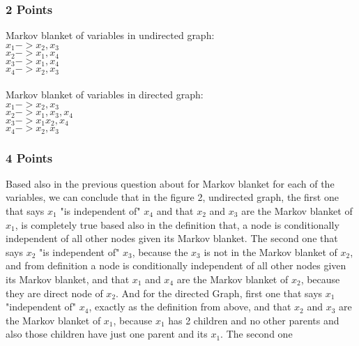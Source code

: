 \subsubsection{2 Points}
Markov blanket of variables in undirected graph:\\ 
$x_1->x_2,x_3$\\
$x_2->x_1,x_4$\\
$x_3->x_1,x_4$\\
$x_4->x_2,x_3$\\ \\
Markov blanket of variables in directed graph:\\
$x_1->x_2,x_3$\\
$x_2->x_1,x_3,x_4$\\
$x_3->x_1x_2,x_4$\\
$x_4->x_2,x_3$


\subsubsection{4 Points}
Based also in the previous question about for Markov blanket for each of the variables, we can conclude that in the figure 2, undirected graph, the first one that says $x_1$ "is independent of" $x_4$ and that $x_2$ and $x_3$ are the Markov blanket of $x_1$, is completely true based also in the definition that, a node is conditionally independent of all other nodes given its Markov blanket. The second one that says $x_2$ "is independent of" $x_3$, because the $x_3$ is not in the Markov blanket of $x_2$, and from definition a node is conditionally independent of all other nodes given its Markov blanket, and that $x_1$ and $x_4$ are the Markov blanket of $x_2$, because they are direct node of $x_2$.
And for the directed Graph, first one that says $x_1$ "independent of" $x_4$, exactly as the definition from above, and that $x_2$ and $x_3$ are the Markov blanket of $x_1$, because $x_1$ has 2 children and no other parents and also those children have just one parent and its $x_1$. The second one 